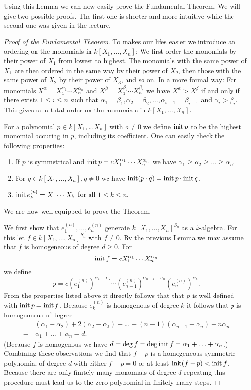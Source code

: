 Using this Lemma we can now easily prove the Fundamental Theorem. We will give two possible proofs. The first one is shorter and more intuitive while the second one was given in the lecture.


\begin{proof}[Proof of the Fundamental Theorem]
To makes our lifes easier we introduce an ordering on the monomials in $k[X_1, \ldots, X_n]$: We first order the monomials by their power of $X_1$ from lowest to highest. The monomials with the same power of $X_1$ are then ordered in the same way by their power of $X_2$, then those with the same power of $X_2$ by their power of $X_3$, and so on. In a more formal way: For monomials $X^\alpha = X_1^{\alpha_1} \cdots X_n^{\alpha_n}$ and $X^\beta = X_1^{\beta_1} \cdots X_n^{\beta_n}$ we have $X^\alpha > X^\beta$ if and only if there exists $1 \leq i \leq n$ such that $\alpha_1 = \beta_1, \alpha_2 = \beta_2, \ldots, \alpha_{i-1} = \beta_{i-1}$ and $\alpha_i > \beta_i$. This gives us a total order on the monomials in $k[X_1, \ldots, X_n]$.
 
 For a polynomial $p \in k[X_1, \ldots X_n]$ with $p \neq 0$ we define $\operatorname{init} p$ to be the highest monomial occuring in $p$, including its coefficient. One can easily check the following properties:
 \begin{enumerate}
  \item
   If $p$ is symmetrical and $\operatorname{init} p = c X_1^{\alpha_1} \cdots X_n^{\alpha_n}$ we have $\alpha_1 \geq \alpha_2 \geq \ldots \geq \alpha_n$.
  \item
   For $q \in k[X_1, \ldots, X_n], q \neq 0$ we have $\operatorname{init} (p \cdot q) = \operatorname{init} p \cdot \operatorname{init} q$.
  \item
   $\operatorname{init} e^{(n)}_k = X_1 \cdots X_k$ for all $1 \leq k \leq n$.
 \end{enumerate}
 We are now well-equipped to prove the Theorem. 
 
 We first show that $e^{(n)}_1, \ldots, e^{(n)}_n$ generate $k[X_1, \ldots, X_n]^{S_n}$ as a $k$-algebra. For this let $f \in k[X_1, \ldots, X_n]^{S_n}$ with $f \neq 0$. By the previous Lemma we may assume that $f$ is homogeneous of degree $d \geq 0$. For
 \[
  \operatorname{init} f = c X_1^{\alpha_1} \cdots X_n^{\alpha_n}
 \]
 we define
 \[
  p = c \left(e^{(n)}_1\right)^{\alpha_1 - \alpha_2} \cdots \left(e^{(n)}_{n-1}\right)^{\alpha_{n-1} - \alpha_n} \left(e^{(n)}_n\right)^{\alpha_n}.
 \]
 From the properties listed above it directly follows that that $p$ is well defined with $\operatorname{init} p = \operatorname{init} f$. Because $e^{(n)}_k$ is homogenous of degree $k$ it follows that $p$ is homogeneous of degree
 \begin{align*}
   &\,(\alpha_1-\alpha_2) + 2(\alpha_2-\alpha_3) + \ldots + (n-1)(\alpha_{n-1}-\alpha_n)+n\alpha_n \\
  =&\, \alpha_1 + \ldots + \alpha_n
  = d.
 \end{align*}
 (Because $f$ is homogenous we have $d = \deg f = \deg \operatorname{init} f = \alpha_1 + \ldots + \alpha_n$.) Combining these observations we find that $f-p$ is a homogeneous symmetric polynomial of degree $d$ with either $f-p = 0$ or at least $\operatorname{init} (f-p) < \operatorname{init} f$. Because there are only finitely many monomials of degree $d$ repeating this procedure must lead us to the zero polynomial in finitely many steps.
 

\end{proof}
